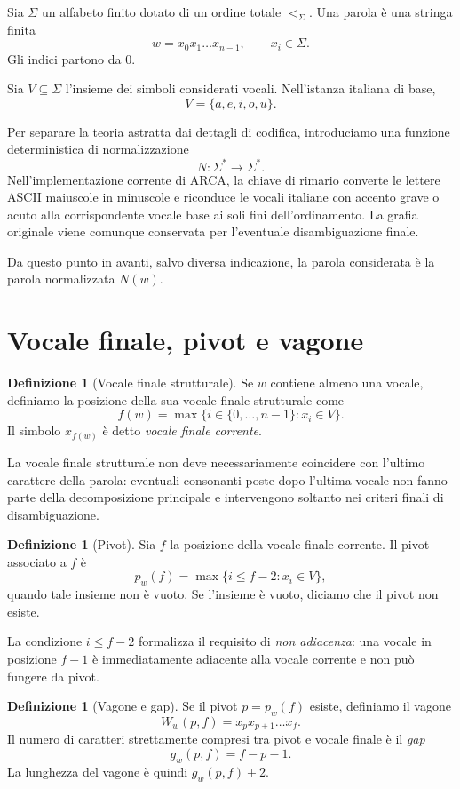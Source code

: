 \documentclass[11pt,a4paper]{article}
\theoremstyle{definition}
\newtheorem{definizione}[teorema]{Definizione}
\theoremstyle{remark}
\newcommand{\Nrm}{N}
\newcommand{\Pivot}{p_w}
\newcommand{\Gap}{g_w}
\newcommand{\Vag}{W_w}
\begin{document}
Sia $\Sigma$ un alfabeto finito dotato di un ordine totale $<_{\Sigma}$. Una parola è una stringa finita
\[
  w=x_0x_1\dots x_{n-1},\qquad x_i\in\Sigma.
\]
Gli indici partono da $0$.

Sia $V\subseteq\Sigma$ l'insieme dei simboli considerati vocali. Nell'istanza italiana di base,
\[
  V=\{a,e,i,o,u\}.
\]

Per separare la teoria astratta dai dettagli di codifica, introduciamo una funzione deterministica di normalizzazione
\[
  \Nrm:\Sigma^*\longrightarrow\Sigma^*.
\]
Nell'implementazione corrente di ARCA, la chiave di rimario converte le lettere ASCII maiuscole in minuscole e riconduce le vocali italiane con accento grave o acuto alla corrispondente vocale base ai soli fini dell'ordinamento. La grafia originale viene comunque conservata per l'eventuale disambiguazione finale.

Da questo punto in avanti, salvo diversa indicazione, la parola considerata è la parola normalizzata $\Nrm(w)$.

\section{Vocale finale, pivot e vagone}

\begin{definizione}[Vocale finale strutturale]
Se $w$ contiene almeno una vocale, definiamo la posizione della sua vocale finale strutturale come
\[
  f(w)=\max\{i\in\{0,\dots,n-1\}:x_i\in V\}.
\]
Il simbolo $x_{f(w)}$ è detto \emph{vocale finale corrente}.
\end{definizione}

La vocale finale strutturale non deve necessariamente coincidere con l'ultimo carattere della parola: eventuali consonanti poste dopo l'ultima vocale non fanno parte della decomposizione principale e intervengono soltanto nei criteri finali di disambiguazione.

\begin{definizione}[Pivot]
Sia $f$ la posizione della vocale finale corrente. Il pivot associato a $f$ è
\[
  \Pivot(f)=\max\{i\leq f-2:x_i\in V\},
\]
quando tale insieme non è vuoto. Se l'insieme è vuoto, diciamo che il pivot non esiste.
\end{definizione}

La condizione $i\leq f-2$ formalizza il requisito di \emph{non adiacenza}: una vocale in posizione $f-1$ è immediatamente adiacente alla vocale corrente e non può fungere da pivot.

\begin{definizione}[Vagone e gap]
Se il pivot $p=\Pivot(f)$ esiste, definiamo il vagone
\[
  \Vag(p,f)=x_px_{p+1}\dots x_f.
\]
Il numero di caratteri strettamente compresi tra pivot e vocale finale è il \emph{gap}
\[
  \Gap(p,f)=f-p-1.
\]
La lunghezza del vagone è quindi $\Gap(p,f)+2$.
\end{definizione}
\end{document}
